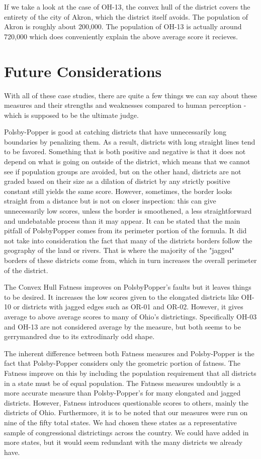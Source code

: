 \documentclass[letterpaper]{article}
\begin{document}
If we take a look at the case of OH-13, the convex hull of the district covers the entirety of the city of Akron, which the district itself avoids. The population of Akron is roughly about 200,000. The population of OH-13 is actually around 720,000 which does conveniently explain the above average score it recieves.

\section{Future Considerations}
With all of these case studies, there are quite a few things we can say about these measures and their strengths and weaknesses compared to human perception - which is supposed to be the ultimate judge.

Polsby-Popper is good at catching districts that have unnecessarily long boundaries by penalizing them. As a result, districts with long straight lines tend to be favored. Something that is both positive and negative is that it does not depend on what is going on outside of the district, which means that we cannot see if population groups are avoided, but on the other hand, districts are not graded based on their size as a dilation of district by any strictly positive constant still yields the same score. However, sometimes, the border looks straight from a distance but is not on closer inspection: this can give unnecessarily low scores, unless the border is smoothened, a less straightforward and undebatable process than it may appear. It can be stated that the main pitfall of PolsbyPopper comes from its perimeter portion of the formula. It did not take into consideration the fact that many of the districts borders follow the geography of the land or rivers. That is where the majority of the "jagged" borders of these districts come from, which in turn increases the overall perimeter of the district.

The Convex Hull Fatness improves on PolsbyPopper's faults but it leaves things to be desired. It increases the low scores given to the elongated districts like OH-10 or districts with jagged edges such as OR-01 and OR-02. However, it gives average to above average scores to many of Ohio's districtings. Specifically OH-03 and OH-13 are not considered average by the measure, but both seems to be gerrymandred due to its extrodinarly odd shape.

The inherent difference between both Fatness measures and Polsby-Popper is the fact that Polsby-Popper considers only the geometric portion of fatness. The Fatness improve on this by including the population requirement that all districts in a state must be of equal population. The Fatness measures undoubtly is a more accurate measure than Polsby-Popper's for many elongated and jagged districts. 
However, Fatness introduces questionable scores to others, mainly the districts of Ohio. Furthermore, it is to be noted that our measures were run on nine of the fifty total states. We had chosen these states as a representative sample of congressional districtings across the country. We could have added in more states, but it would seem redundant with the many districts we already have.

\printbibliography
\end{document}
